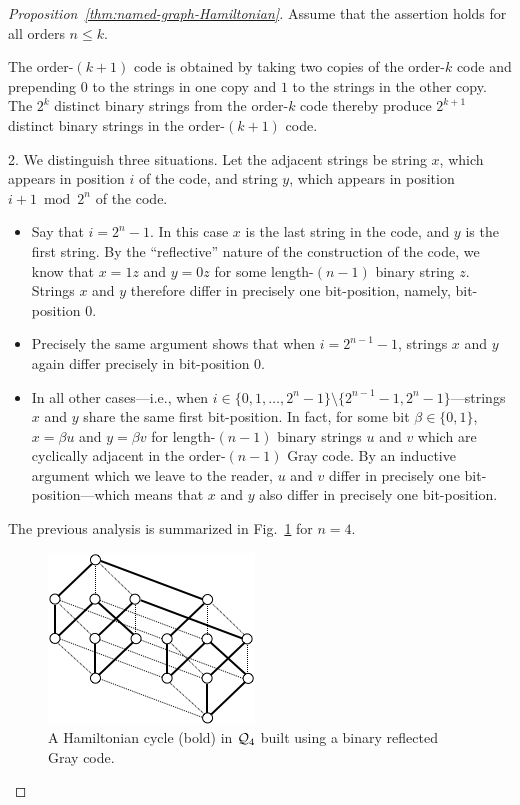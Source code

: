 \begin{proof}[Proposition~\ref{thm:named-graph-Hamiltonian}]
Assume that the assertion holds for all orders $n \leq k$.

The order-$(k+1)$ code is obtained by taking two copies of the order-$k$ code and prepending $0$ to the strings in one copy and $1$ to the strings in the other copy.  The $2^k$ distinct binary strings from the order-$k$ code thereby produce $2^{k+1}$ distinct binary strings in the order-$(k+1)$ code.

\medskip

 2.
We distinguish three situations.  Let the adjacent strings be string $x$, which appears in position $i$ of the code, and string $y$, which appears in position $i+1 \bmod 2^n$ of the code.
  \begin{itemize}
  \item
Say that $i = 2^n-1$.  In this case $x$ is the last string in the code, and $y$ is the first string.  By the ``reflective'' nature of the construction of the code, we know that $x = 1z$ and $y = 0z$ for some length-$(n-1)$ binary string $z$.  Strings $x$ and $y$ therefore differ in precisely one bit-position, namely, bit-position $0$.

  \item
Precisely the same argument shows that when $i = 2^{n-1} -1$, strings $x$ and $y$ again differ precisely in bit-position $0$.

  \item
In all other cases---i.e., when $i \in \{0,1, \ldots, 2^n-1\} \setminus \{2^{n-1} -1, 2^n-1\}$---strings  $x$ and $y$ share the same first bit-position.  In fact, for some bit $\beta \in \{0,1\}$, $x = \beta u$ and $y = \beta v$ for length-$(n-1)$ binary strings $u$ and $v$ which are cyclically adjacent in the order-$(n-1)$ Gray code.  By an inductive argument which we leave to the reader, $u$ and $v$ differ in precisely one bit-position---which means that $x$ and $y$ also differ in precisely one bit-position.
  \end{itemize}
The previous analysis is summarized in Fig.~\ref{fig:HamiltonHypercude} for $n=4$.
  \begin{figure}[hbt]
\begin{center}
       \includegraphics[scale=0.5]{FiguresGraph/HamiltonHypercube}
       \caption{A Hamiltonian cycle (bold) in $\mbox{$\cal Q$}_4$ built using a binary reflected Gray code.}
  \label{fig:HamiltonHypercude}
\end{center}
\end{figure}


\end{proof}
